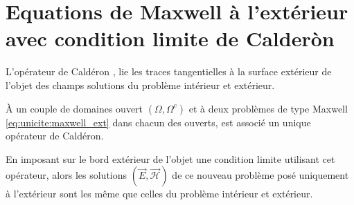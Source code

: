 \documentclass[12pt,%
    twoside,%
    a4paper,%
    openright, %
    ]{book}
\numberwithin{equation}{section} %
\newcommand{\vect}[1]{{\overset{\rightarrow}{#1}}}
\newcommand{\vE}{\vect{E}}
\newcommand{\cH}{\mathcal{H}}
\newcommand{\vH}{\vect{\cH}}
\begin{document}
\section{Equations de Maxwell à l'extérieur avec condition limite de Calderòn}
  L'opérateur de Caldéron \cite[Def~4, p.~108]{cessenat_mathematical_1996}, lie les traces tangentielles à la surface extérieur de l'objet des champs solutions du problème intérieur et extérieur.
  
  À un couple de domaines ouvert \((\Omega, \Omega^c)\) et à deux problèmes de type Maxwell \eqref{eq:unicite:maxwell_ext} dans chacun des ouverts, est associé un unique opérateur de Caldéron.

  En imposant sur le bord extérieur de l'objet une condition limite utilisant cet opérateur, alors les solutions \((\vE,\vH)\) de ce nouveau problème posé uniquement à l'extérieur sont les même que celles du problème intérieur et extérieur.
\end{document}
